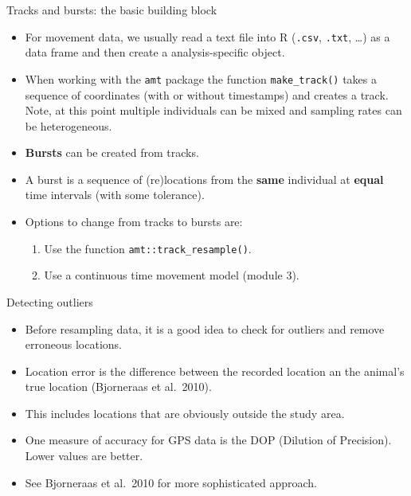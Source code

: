 \documentclass[ignorenonframetext,,t]{beamer}
\let\oldtextbf\textbf
\renewcommand{\textbf}[1]{\textcolor{spamwell}{\oldtextbf{#1}}}
\providecommand{\tightlist}{%
\setlength{\itemsep}{0pt}\setlength{\parskip}{0pt}}
\providecommand{\tightlist}{%
\setlength{\itemsep}{0pt}\setlength{\parskip}{0pt}}
\renewcommand{\tightlist}{\setlength{\itemsep}{1.4ex}\setlength{\parskip}{0pt}}
\begin{document}
\begin{frame}[fragile]{Tracks and bursts: the basic building block}
\protect\hypertarget{tracks-and-bursts-the-basic-building-block}{}
\begin{itemize}
\item
  For movement data, we usually read a text file into R (\texttt{.csv},
  \texttt{.txt}, \ldots) as a data frame and then create a
  analysis-specific object.
\item
  When working with the \texttt{amt} package the function
  \texttt{make\_track()} takes a sequence of coordinates (with or
  without timestamps) and creates a track. Note, at this point multiple
  individuals can be mixed and sampling rates can be heterogeneous.
\end{itemize}
\end{frame}

\begin{frame}[fragile]
\begin{itemize}
\tightlist
\item
  \textbf{Bursts} can be created from tracks.
\item
  A burst is a sequence of (re)locations from the \textbf{same}
  individual at \textbf{equal} time intervals (with some tolerance).
\item
  Options to change from tracks to bursts are:

  \begin{enumerate}
  \tightlist
  \item
    Use the function \texttt{amt::track\_resample()}.
  \item
    Use a continuous time movement model (module 3).
  \end{enumerate}
\end{itemize}
\end{frame}

\begin{frame}
\begin{block}{Detecting outliers}
\protect\hypertarget{detecting-outliers}{}
\begin{itemize}
\tightlist
\item
  Before resampling data, it is a good idea to check for outliers and
  remove erroneous locations.
\item
  Location error is the difference between the recorded location an the
  animal's true location (Bjorneraas et al.~2010).
\item
  This includes locations that are obviously outside the study area.
\item
  One measure of accuracy for GPS data is the DOP (Dilution of
  Precision). Lower values are better.
\item
  See Bjorneraas et al.~2010 for more sophisticated approach.
\end{itemize}
\end{block}
\end{frame}
\end{document}
